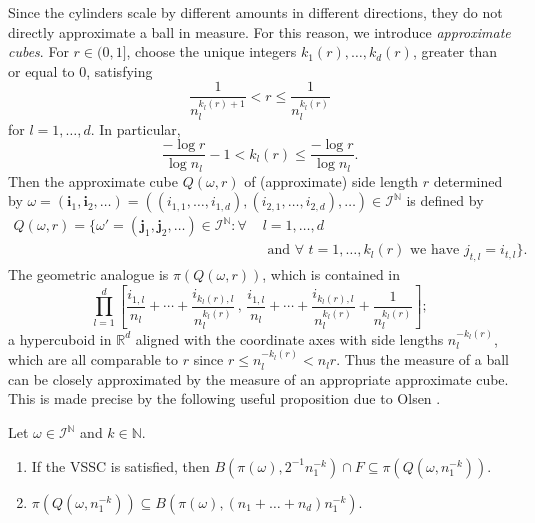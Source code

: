 Since the cylinders scale by different amounts in different directions, they do not directly approximate a ball in measure.  For this reason, we introduce \emph{approximate cubes}. For $r\in (0,1]$, choose the unique integers $k_1(r),\ldots,k_d(r)$, greater than or equal to 0, satisfying
\[
\frac{1}{n_l^{k_l(r)+1}}< r \leq \frac{1}{n_l^{k_l(r)}}
\]
for $l=1,\ldots,d$. In particular, 
\begin{equation}\label{ch-upper-reg:k_in_self_affine}
\frac{-\log r}{\log n_l}-1 < k_l(r) \leq \frac{-\log r}{\log n_l}.
\end{equation}
Then the approximate cube $Q(\omega, r)$ of (approximate) side length $r$ determined by $\omega =\left( \textbf{i}_1, \textbf{i}_2 , \ldots \right) =\left( (i_{1,1}, \dots, i_{1,d}), (i_{2,1}, \dots, i_{2,d}) , \ldots \right)    \in \mathcal{I}^{\mathbb{N}}$ is defined by
\begin{align*}
Q(\omega, r)=\big\{ \omega'=\left( \textbf{j}_1, \textbf{j}_2 , \ldots \right)\in \mathcal{I}^{\mathbb{N}} : \forall \, \,  &l=1, \ldots, d \\
&\text{ and } \forall\, \, t= 1, \ldots, k_l(r) \text{ we have } j_{t,l}=i_{t,l} \big\}.
\end{align*}
The geometric analogue is $\pi\left(Q(\omega, r)\right)$, which is contained in
\[ 
\prod_{l=1}^d \left[\frac{i_{1,l}}{n_l}+\cdots+\frac{i_{k_l(r),l}}{n_l^{k_l(r)}} \, , \, \frac{i_{1,l}}{n_l}+\cdots+\frac{i_{k_l(r),l}}{n_l^{k_l(r)}}+\frac{1}{n_l^{k_l(r)}} \right];
\]
a hypercuboid in $\mathbb{R}^d$ aligned with the coordinate axes with side lengths $n_l^{-k_l(r)}$, which are all comparable to $r$ since $ r \leq n_l^{-k_l(r)} < n_l r$.  Thus the measure of a ball can be closely approximated by the measure of an appropriate approximate cube.  This is made precise by the following useful proposition due to Olsen \cite[Proposition 6.2.1]{sponges}.
\begin{proposition} \label{ch-upper-reg:ballscubes}
	Let $\omega \in \mathcal{I}^{\mathbb{N}}$ and $k \in \mathbb{N}$.
	\begin{enumerate} 
		\item If the VSSC is satisfied, then $B\left( \pi(\omega), 2^{-1}n_1^{-k}\right)\cap F \subseteq \pi \left(Q\left( \omega, n_1^{-k} \right) \right).$ 
		\item  $\pi \left(Q\left( \omega, n_1^{-k} \right) \right) \subseteq B\left( \pi(\omega), (n_1+\dots+n_d)n_1^{-k}\right).$ 
	\end{enumerate}
\end{proposition}

